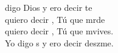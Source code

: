 \begin{cancion}%
	 digo Dios y ero decir te  \\
	quiero decir , Tú que mrde\\
	quiero decir , Tú que mvives.\\
	Yo digo s y ero decir deszme.\\
	\jump\\
	  \\
\end{cancion}%
